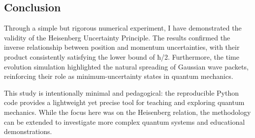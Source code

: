 \subsection{Conclusion}\label{conclusion}

Through a simple but rigorous numerical experiment, I have demonstrated
the validity of the Heisenberg Uncertainty Principle. The results
confirmed the inverse relationship between position and momentum
uncertainties, with their product consistently satisfying the lower
bound of ħ/2. Furthermore, the time evolution simulation highlighted the
natural spreading of Gaussian wave packets, reinforcing their role as
minimum-uncertainty states in quantum mechanics.

This study is intentionally minimal and pedagogical: the reproducible
Python code provides a lightweight yet precise tool for teaching and
exploring quantum mechanics. While the focus here was on the Heisenberg
relation, the methodology can be extended to investigate more complex
quantum systems and educational demonstrations.
